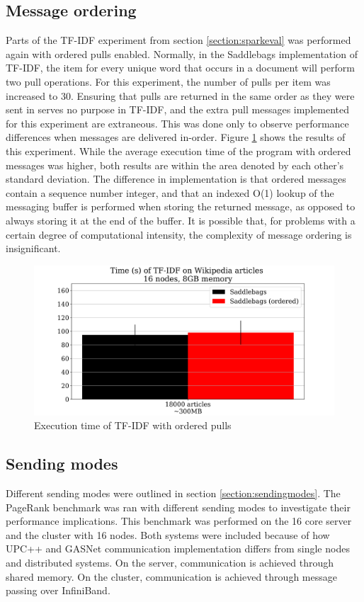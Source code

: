 \documentclass{uit-report}
\begin{document}
\subsection{Message ordering}
Parts of the TF-IDF experiment from section \ref{section:sparkeval} was performed again with ordered pulls enabled. Normally, in the Saddlebags implementation of TF-IDF, the item for every unique word that occurs in a document will perform two pull operations. For this experiment, the number of pulls per item was increased to 30. Ensuring that pulls are returned in the same order as they were sent in serves no purpose in TF-IDF, and the extra pull messages implemented for this experiment are extraneous. This was done only to observe performance differences when messages are delivered in-order. Figure \ref{fig:ordering} shows the results of this experiment. While the average execution time of the program with ordered messages was higher, both results are within the area denoted by each other's standard deviation. The difference in implementation is that ordered messages contain a sequence number integer, and that an indexed O(1) lookup of the messaging buffer is performed when storing the returned message, as opposed to always storing it at the end of the buffer. It is possible that, for problems with a certain degree of computational intensity, the complexity of message ordering is insignificant.
\vskip 0.5cm
\begin{figure}[H]
	\centering
	\includegraphics[width=13cm]{illustrations/png/messageordering.png}
	\caption{Execution time of TF-IDF with ordered pulls}
	\label{fig:ordering}
\end{figure}
\newpage
\subsection{Sending modes} \label{section:sendingmodeseval}
Different sending modes were outlined in section \ref{section:sendingmodes}. The PageRank benchmark was ran with different sending modes to investigate their performance implications. This benchmark was performed on the 16 core server and the cluster with 16 nodes. Both systems were included because of how UPC++ and GASNet communication implementation differs from single nodes and distributed systems. On the server, communication is achieved through shared memory. On the cluster, communication is achieved through message passing over InfiniBand.
\end{document}
